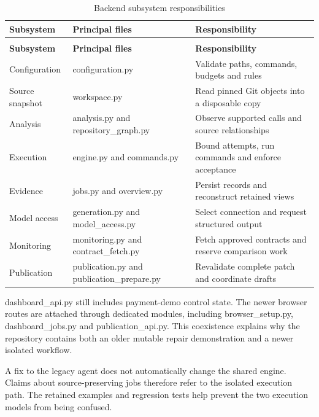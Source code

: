 \documentclass[12pt,a4paper,oneside]{report}
\begin{document}
\begingroup\normalsize\onehalfspacing\setlength{\tabcolsep}{4pt}\renewcommand{\arraystretch}{1.2}
\begin{longtable}{@{}>{\raggedright\arraybackslash}p{}>{\raggedright\arraybackslash}p{}>{\raggedright\arraybackslash}p{}@{}}
\caption{Backend subsystem responsibilities}\label{tab:4.1}\\
\toprule
\textbf{Subsystem} & \textbf{Principal files} & \textbf{Responsibility}\\\midrule
\endfirsthead
\multicolumn{3}{l}{\small Table 4.1 continued}\\\toprule
\textbf{Subsystem} & \textbf{Principal files} & \textbf{Responsibility}\\\midrule
\endhead
\bottomrule\endfoot
Configuration & configuration.py & Validate paths, commands, budgets and rules\\
Source snapshot & workspace.py & Read pinned Git objects into a disposable copy\\
Analysis & analysis.py and repository\_graph.py & Observe supported calls and source relationships\\
Execution & engine.py and commands.py & Bound attempts, run commands and enforce acceptance\\
Evidence & jobs.py and overview.py & Persist records and reconstruct retained views\\
Model access & generation.py and model\_access.py & Select connection and request structured output\\
Monitoring & monitoring.py and contract\_fetch.py & Fetch approved contracts and reserve comparison work\\
Publication & publication.py and publication\_prepare.py & Revalidate complete patch and coordinate drafts\\
\end{longtable}\endgroup

dashboard\_api.py still includes payment-demo control state. The newer browser routes are attached through dedicated modules, including browser\_setup.py, dashboard\_jobs.py and publication\_api.py. This coexistence explains why the repository contains both an older mutable repair demonstration and a newer isolated workflow.

A fix to the legacy agent does not automatically change the shared engine. Claims about source-preserving jobs therefore refer to the isolated execution path. The retained examples and regression tests help prevent the two execution models from being confused.
\end{document}
